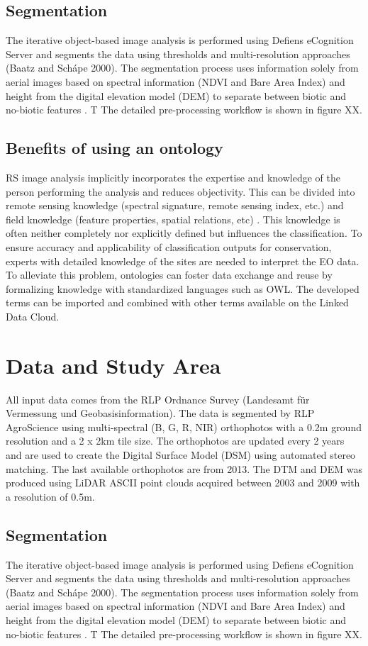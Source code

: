 \documentclass[authoryear, review,12pt,number]{elsarticle}
\begin{document}
\subsection{Segmentation} The iterative object-based image analysis is
performed using Defiens eCognition Server and segments the data using
thresholds and multi-resolution approaches (Baatz and Sch\'ape 2000). The
segmentation process uses information solely from aerial images based on
spectral information (NDVI and Bare Area Index) and height from the digital
elevation model (DEM) to separate between biotic and no-biotic features
\citep{Tintrup2015}. T The detailed pre-processing workflow is shown in figure
XX.
\subsection{Benefits of using an ontology}
RS image analysis implicitly incorporates the expertise and
knowledge of the person performing the analysis and reduces objectivity. This
can be divided into remote sensing knowledge (spectral signature, remote
sensing index, etc.) and field knowledge (feature properties, spatial
relations, etc) \citep{Andres2013a}. This knowledge is often neither completely
nor explicitly defined but influences the classification. To ensure accuracy and
applicability of classification outputs for conservation, experts with detailed
knowledge of the sites are needed to interpret the EO data. To alleviate this
problem, ontologies can foster data exchange and reuse by formalizing knowledge
with standardized languages such as OWL. The developed terms can be imported and
combined with other terms available on the Linked Data Cloud. 
\section{Data and Study Area}
All input data comes from the RLP Ordnance Survey (Landesamt f\"ur Vermessung 
und Geobasisinformation). The data is segmented by RLP AgroScience using
multi-spectral (B, G, R, NIR) orthophotos with a 0.2m ground resolution and a
2 x 2km tile size. The orthophotos are updated every 2 years and are used to
create the Digital Surface Model (DSM) using automated stereo matching. The
last available orthophotos are from 2013. The DTM and
DEM was produced using LiDAR ASCII point clouds acquired between 2003 and 2009
with a resolution of 0.5m.\\
\subsection{Segmentation}
The iterative object-based image analysis is performed using Defiens eCognition
Server and segments the data using thresholds and multi-resolution approaches
(Baatz and Sch\'ape 2000). The segmentation process uses information solely
from aerial images based on spectral information (NDVI and Bare Area Index) and
height from the digital elevation model (DEM) to separate
between biotic and no-biotic features \citep{Tintrup2015}. T 
The detailed pre-processing workflow is shown in figure XX.
\end{document}
